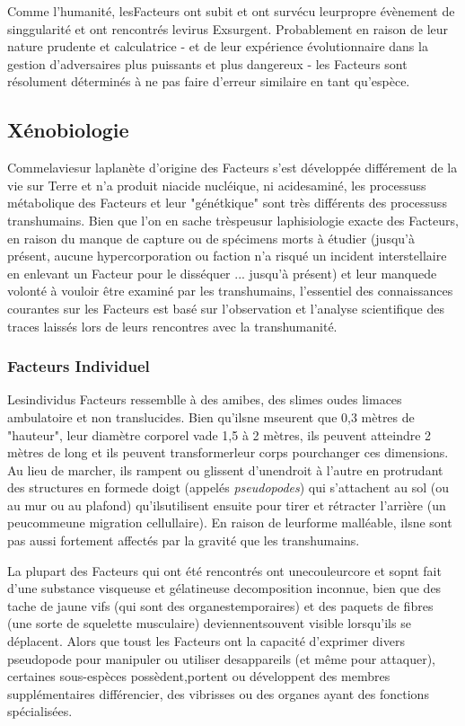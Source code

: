 Comme l'humanité, lesFacteurs ont subit et ont survécu leurpropre évènement de singgularité et ont rencontrés levirus Exsurgent. Probablement en raison de leur nature prudente et calculatrice - et de leur expérience évolutionnaire dans la gestion d'adversaires plus puissants et plus dangereux - les Facteurs sont résolument déterminés à ne pas faire d'erreur similaire en tant qu'espèce. 

\subsection{Xénobiologie} 

Commelaviesur laplanète d'origine des Facteurs s'est développée différement de la vie sur Terre et n'a produit niacide nucléique, ni acidesaminé, les processuss métabolique des Facteurs et leur "génétkique" sont très différents des processuss transhumains. Bien que l'on en sache trèspeusur laphisiologie exacte des Facteurs, en raison du manque de capture ou de spécimens morts à étudier (jusqu'à présent, aucune hypercorporation ou faction n'a risqué un incident interstellaire en enlevant un Facteur pour le disséquer ... jusqu'à présent) et leur manquede volonté à vouloir être examiné par les transhumains, l'essentiel des connaissances courantes sur les Facteurs est basé sur l'observation et l'analyse scientifique des traces laissés lors de leurs rencontres avec la transhumanité. 

\subsubsection{Facteurs Individuel} 

Lesindividus Facteurs ressemblle à des amibes, des slimes oudes limaces ambulatoire et non translucides. Bien qu'ilsne mseurent que 0,3 mètres de "hauteur", leur diamètre corporel vade 1,5 à 2 mètres, ils peuvent atteindre 2 mètres de long et ils peuvent transformerleur corps pourchanger ces dimensions. Au lieu de marcher, ils rampent ou glissent d'unendroit à l'autre en protrudant des structures en formede doigt (appelés \textit{pseudopodes}) qui s'attachent au sol (ou au mur ou au plafond) qu'ilsutilisent ensuite pour tirer et rétracter l'arrière (un peucommeune migration cellullaire). En raison de leurforme malléable, ilsne sont pas aussi fortement affectés par la gravité que les transhumains. 

La plupart des Facteurs qui ont été rencontrés ont unecouleurcore et sopnt fait d'une substance visqueuse et gélatineuse decomposition inconnue, bien que des tache de jaune vifs (qui sont des organestemporaires) et des paquets de fibres (une sorte de squelette musculaire) deviennentsouvent visible lorsqu'ils se déplacent. Alors que toust  les Facteurs ont la capacité d'exprimer divers pseudopode pour manipuler ou utiliser desappareils (et même pour attaquer), certaines sous-espèces possèdent,portent ou développent des membres supplémentaires différencier, des vibrisses ou des organes ayant des fonctions spécialisées. 

